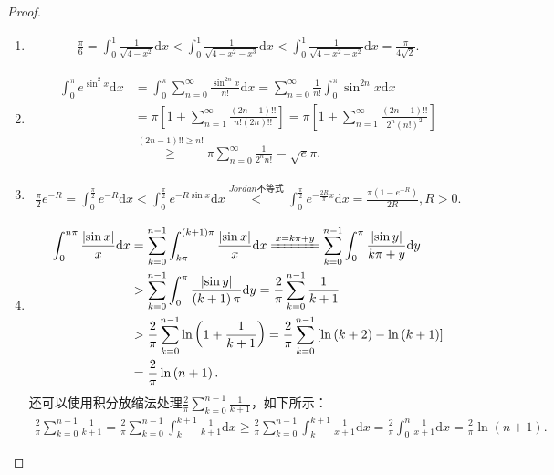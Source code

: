 \documentclass[../../main.tex]{subfiles}
\begin{document}
\begin{proof}
\begin{enumerate}
\item \begin{align*}
\frac{\pi}{6}=\int_{0}^{1}\frac{1}{\sqrt{4 - x^{2}}}\mathrm{d}x < \int_{0}^{1}\frac{1}{\sqrt{4 - x^{2}-x^{3}}}\mathrm{d}x < \int_{0}^{1}\frac{1}{\sqrt{4 - x^{2}-x^{2}}}\mathrm{d}x=\frac{\pi}{4\sqrt{2}}.
\end{align*}

\item \begin{align*}
\int_0^{\pi}{e^{\sin ^2x}\mathrm{d}x}&=\int_0^{\pi}{\sum_{n=0}^{\infty}{\frac{\sin ^{2n}x}{n!}}\mathrm{d}x}=\sum_{n=0}^{\infty}{\frac{1}{n!}\int_0^{\pi}{\sin ^{2n}x\mathrm{d}x}}
\\
&=\pi \left[ 1+\sum_{n=1}^{\infty}{\frac{(2n-1)!!}{n!(2n)!!}} \right] =\pi \left[ 1+\sum_{n=1}^{\infty}{\frac{(2n-1)!!}{2^n\left( n! \right) ^2}} \right] 
\\
&\overset{(2n-1)!!\geqslant n!}{\geqslant}\pi \sum_{n=0}^{\infty}{\frac{1}{2^nn!}}=\sqrt{e}\pi .
\end{align*}

\item \begin{align*}
\frac{\pi}{2}e^{-R}=\int_{0}^{\frac{\pi}{2}}e^{-R}\mathrm{d}x < \int_{0}^{\frac{\pi}{2}}e^{-R\sin x}\mathrm{d}x\stackrel{\hyperref[theorem:Jordan不等式]{Jordan\text{不等式}}}{<}\int_{0}^{\frac{\pi}{2}}e^{-\frac{2R}{\pi}x}\mathrm{d}x=\frac{\pi(1 - e^{-R})}{2R}, R > 0.
\end{align*} 

\item \begin{align*}
\int_0^{n\pi}{\frac{\left| \sin x \right|}{x}\mathrm{d}x}&=\sum_{k=0}^{n-1}{\int_{k\pi}^{\left( k+1 \right) \pi}{\frac{\left| \sin x \right|}{x}\mathrm{d}x}}\xlongequal{x=k\pi +y}\sum_{k=0}^{n-1}{\int_0^{\pi}{\frac{\left| \sin y \right|}{k\pi +y}\mathrm{d}y}}
\\
&>\sum_{k=0}^{n-1}{\int_0^{\pi}{\frac{\left| \sin y \right|}{\left( k+1 \right) \pi}\mathrm{d}y}}=\frac{2}{\pi}\sum_{k=0}^{n-1}{\frac{1}{k+1}}
\\
&>\frac{2}{\pi}\sum_{k=0}^{n-1}{\ln \left( 1+\frac{1}{k+1} \right)}=\frac{2}{\pi}\sum_{k=0}^{n-1}{\left[ \ln \left( k+2 \right) -\ln \left( k+1 \right) \right]}
\\
&=\frac{2}{\pi}\ln \left( n+1 \right) .
\end{align*}
还可以使用积分放缩法处理$\frac{2}{\pi}\sum_{k=0}^{n-1}{\frac{1}{k+1}}$，如下所示：
\begin{align*}
\frac{2}{\pi}\sum_{k=0}^{n-1}{\frac{1}{k+1}}=\frac{2}{\pi}\sum_{k=0}^{n-1}{\int_k^{k+1}{\frac{1}{k+1}\mathrm{d}x}}\geqslant \frac{2}{\pi}\sum_{k=0}^{n-1}{\int_k^{k+1}{\frac{1}{x+1}\mathrm{d}x}}=\frac{2}{\pi}\int_0^n{\frac{1}{x+1}\mathrm{d}x}=\frac{2}{\pi}\ln \left( n+1 \right) .
\end{align*}
\end{enumerate}
\end{proof}
\end{document}
